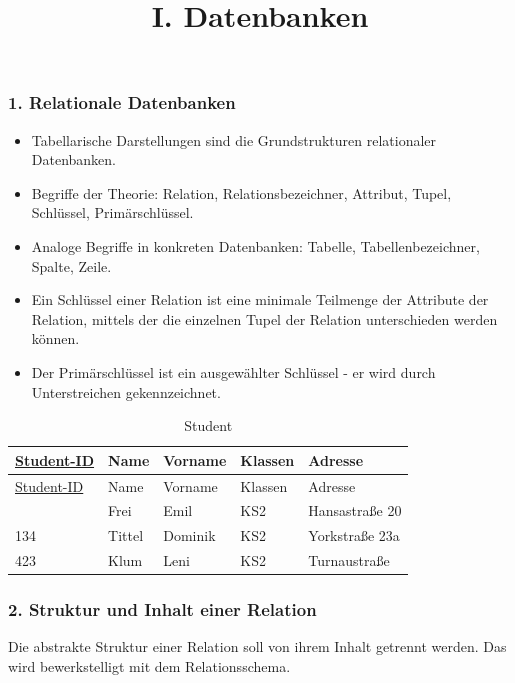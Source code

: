\documentclass[
  11pt,
  a4paper,
  DIV=11,
  numbers=noendperiod]{scrartcl}
\title{I. Datenbanken}
\author{}
\date{}
\begin{document}
\maketitle


\subsubsection{1. Relationale
Datenbanken}\label{relationale-datenbanken}

\begin{itemize}
\item
  Tabellarische Darstellungen sind die Grundstrukturen relationaler
  Datenbanken.
\item
  Begriffe der Theorie: Relation, Relationsbezeichner, Attribut, Tupel,
  Schlüssel, Primärschlüssel.
\item
  Analoge Begriffe in konkreten Datenbanken: Tabelle,
  Tabellenbezeichner, Spalte, Zeile.
\item
  Ein Schlüssel einer Relation ist eine minimale Teilmenge der Attribute
  der Relation, mittels der die einzelnen Tupel der Relation
  unterschieden werden können.
\item
  Der Primärschlüssel ist ein ausgewählter Schlüssel - er wird durch
  Unterstreichen gekennzeichnet.
\end{itemize}

\begin{longtable}[]{@{}lllll@{}}
\caption{Student}\tabularnewline
\toprule\noalign{}
\ul{Student-ID} & Name & Vorname & Klassen & Adresse \\
\midrule\noalign{}
\endfirsthead
\toprule\noalign{}
\ul{Student-ID} & Name & Vorname & Klassen & Adresse \\
\midrule\noalign{}
\endhead
\bottomrule\noalign{}
\endlastfoot
212 & Frei & Emil & KS2 & Hansastraße 20 \\
134 & Tittel & Dominik & KS2 & Yorkstraße 23a \\
423 & Klum & Leni & KS2 & Turnaustraße \\
\end{longtable}

\subsubsection{2. Struktur und Inhalt einer
Relation}\label{struktur-und-inhalt-einer-relation}

Die abstrakte Struktur einer Relation soll von ihrem Inhalt getrennt
werden. Das wird bewerkstelligt mit dem Relationsschema.
\end{document}
